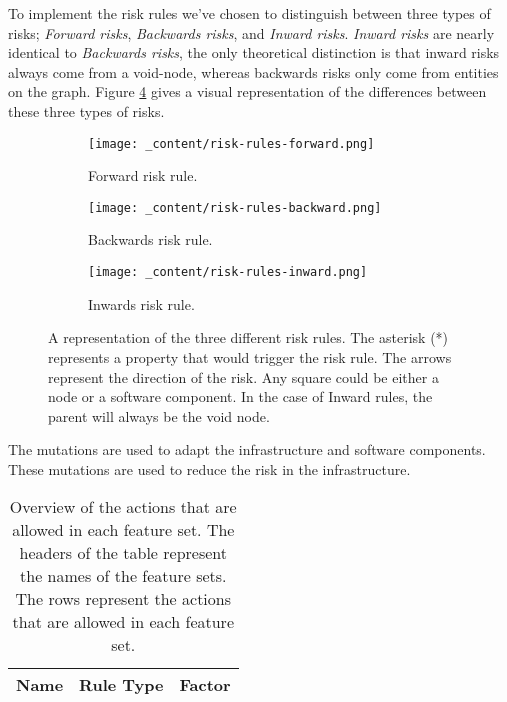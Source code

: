 To implement the risk rules we've chosen to distinguish between three types of risks; \emph{Forward risks}, \emph{Backwards risks}, and \emph{Inward risks}. \emph{Inward risks} are nearly identical to \emph{Backwards risks}, the only theoretical distinction is that inward risks always come from a void-node, whereas backwards risks only come from entities on the graph. Figure \ref{fig:risk-rules} gives a visual representation of the differences between these three types of risks.

\begin{figure}[H]
    \begin{subfigure}[b]{0.3\textwidth}
        \centering
        \texttt{[image: \_content/risk-rules-forward.png]}
        \caption{Forward risk rule.}
        \label{fig:risk-rule-forward}
    \end{subfigure}
    \begin{subfigure}[b]{0.3\textwidth}
        \centering
        \texttt{[image: \_content/risk-rules-backward.png]}
        \caption{Backwards risk rule.}
        \label{fig:risk-rule-backward}
    \end{subfigure}
    \begin{subfigure}[b]{0.3\textwidth}
        \centering
        \texttt{[image: \_content/risk-rules-inward.png]}
        \caption{Inwards risk rule.}
        \label{fig:risk-rule-inward}
    \end{subfigure}
    \caption{A representation of the three different risk rules. The asterisk (*) represents a property that would trigger the risk rule. The arrows represent the direction of the risk. Any square could be either a node or a software component. In the case of Inward rules, the parent will always be the void node.}
    \label{fig:risk-rules}
\end{figure}


The mutations are used to adapt the infrastructure and software components. These mutations are used to reduce the risk in the infrastructure.

\begin{table}[H]
        \centering
        \begin{tabular}{l|l|l}
            \textbf{Name} & \textbf{Rule Type} & \textbf{Factor} \\ \hline
        \end{tabular}
        \caption{\label{table:experiment-features}Overview of the actions that are allowed in each feature set. The headers of the table represent the names of the feature sets. The rows represent the actions that are allowed in each feature set.}
\end{table}


